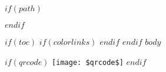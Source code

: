 \documentclass[a4paper,11pt]{article}
\begin{document}
$if(path)$

$endif$

$if(toc)$
{
		$if(colorlinks)$
		\hypersetup{linkcolor=$if(toccolor)$$toccolor$$else$$endif$}
		$endif$
		\setcounter{secnumdepth}{3}
		\setcounter{tocdepth}{$toc_depth$}
		\tableofcontents
	}
$endif$
\newpage
$body$
\vspace{10mm}

$if(qrcode)$
\texttt{[image: \$qrcode\$]}
$endif$
\end{document}
